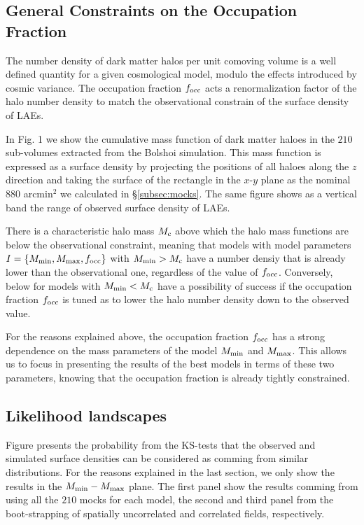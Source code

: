 \documentclass{emulateapj}
\begin{document}
\subsection{General Constraints on the Occupation Fraction}
The number density of dark matter halos per unit comoving volume is a well defined quantity for a given cosmological model, modulo the effects introduced by cosmic variance. The occupation fraction $f_{\rm occ}$ acts a renormalization factor of the halo number density to match the observational constrain of the surface density of LAEs.

In Fig. 1 we show the cumulative mass function of dark matter haloes in the $210$ sub-volumes extracted from the Bolshoi simulation. This mass function is expressed as a surface density by projecting the positions of all haloes along the $z$ direction and taking the surface of the rectangle in the $x$-$y$ plane as the nominal $880$ arcmin$^{2}$ we calculated in \S\ref{subsec:mocks}. The same figure shows as a vertical band the range of observed surface density of LAEs. 


There is a characteristic halo mass $M_{\rm c}$ above which the halo mass functions are below the observational constraint, meaning that models with model parameters $I=\{M_{\rm min}, M_{\rm max}, f_{\rm occ}\}$ with $M_{\rm min}> M_{\rm c}$ have a number densiy that is already lower than the observational one, regardless of the value of $f_{\rm occ}$. Conversely, below for models with $M_{\rm min}<M_{\rm c}$ have a possibility of success if the occupation fraction $f_{\rm occ}$ is tuned as to lower the halo number density down to the observed value. 

For the reasons explained above, the occupation fraction $f_{\rm occ}$ has a strong dependence on the mass parameters of the model $M_{\rm min}$ and $M_{\rm max}$. This allows us to focus in presenting the results of the best models in terms of these two parameters, knowing that the occupation fraction is already tightly constrained.


\subsection{Likelihood landscapes}


Figure \label{figure:landscape} presents the probability from the KS-tests that the observed and simulated surface densities can be considered as comming from similar distributions. For the reasons explained in the last section, we only show the results in the $M_{\rm min}-M_{\rm max}$ plane. The first panel show the results comming from using all the $210$ mocks for each model, the second and third panel from the boot-strapping of spatially uncorrelated and correlated fields, respectively.
\end{document}
